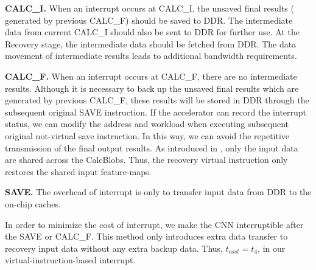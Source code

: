 \textbf{CALC\_I.} 
When an interrupt occurs at CALC\_I, the unsaved final results ( generated by previous CALC\_F) should be saved to DDR. The intermediate data from current CALC\_I should also be sent to DDR for further use. At the Recovery stage, the intermediate data should be fetched from DDR. The data movement of intermediate results leads to additional bandwidth requirements.


\textbf{CALC\_F.}
When an interrupt occurs at CALC\_F, there are no intermediate results. 
Although it is necessary to back up the unsaved final results which are generated by previous CALC\_F, these results will be stored in DDR through the subsequent original SAVE instruction.
If the accelerator can record the interrupt status, we can modify the address and workload when executing subsequent original not-virtual save instruction.
In this way, we can avoid the repetitive transmission of the final output results.
As introduced in , only the input data are shared across the CalcBlobs. Thus, the recovery virtual instruction only restores the shared input feature-maps.



\textbf{SAVE.}
The overhead of interrupt is only to transfer input data from DDR to the on-chip caches. 

In order to minimize the cost of interrupt, we make the CNN interruptible after the SAVE or CALC\_F. This method only introduces extra data transfer to recovery input data without any extra backup data. Thus, $t_{cost} = t_4$, in our virtual-instruction-based interrupt.





